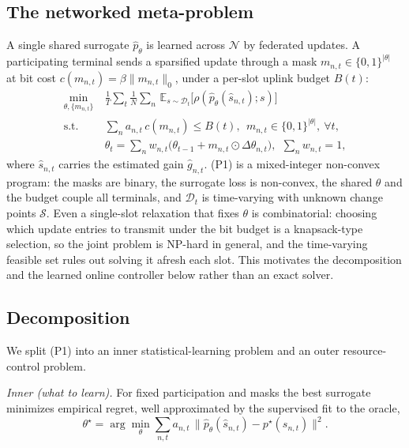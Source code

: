 \documentclass[journal]{IEEEtran}
\newcommand{\pstar}{p^{\star}}
\begin{document}
\subsection{The networked meta-problem}
A single shared surrogate $\hat p_\theta$ is learned across $\mathcal N$ by
federated updates. A participating terminal sends a sparsified update through a mask
$m_{n,t}\in\{0,1\}^{|\theta|}$ at bit cost $c(m_{n,t})=\beta\|m_{n,t}\|_0$, under a
per-slot uplink budget $B(t)$:
\begin{equation}
\tag{P1}
\begin{aligned}
\min_{\theta,\{m_{n,t}\}}\ &\frac1{T}{\textstyle\sum_{t}}\frac1{N}{\textstyle\sum_{n}}\,
   \mathbb E_{s\sim\mathcal D_t}\big[\rho(\hat p_\theta(\hat s_{n,t});s)\big]\\[-1pt]
\text{s.t.}\ & {\textstyle\sum_{n}} a_{n,t}\,c(m_{n,t})\le B(t),\ \ m_{n,t}\!\in\!\{0,1\}^{|\theta|},\ \forall t,\\[-1pt]
& \theta_{t}={\textstyle\sum_n} w_{n,t}\big(\theta_{t-1}+m_{n,t}\!\odot\!\Delta\theta_{n,t}\big),\ \ {\textstyle\sum_n} w_{n,t}=1,
\end{aligned}
\label{eq:p1}
\end{equation}
where $\hat s_{n,t}$ carries the estimated gain $\hat g_{n,t}$. (P1) is a
mixed-integer non-convex program: the masks are binary, the surrogate loss is
non-convex, the shared $\theta$ and the budget couple all terminals, and
$\mathcal D_t$ is time-varying with unknown change points $\mathcal S$. Even a
single-slot relaxation that fixes $\theta$ is combinatorial: choosing which update
entries to transmit under the bit budget is a knapsack-type selection, so the joint
problem is NP-hard in general, and the time-varying feasible set rules out solving
it afresh each slot. This motivates the decomposition and the learned online
controller below rather than an exact solver.

\subsection{Decomposition}\label{sec:decomp}
We split (P1) into an inner statistical-learning problem and an outer
resource-control problem.

\emph{Inner (what to learn).} For fixed participation and masks the best surrogate
minimizes empirical regret, well approximated by the supervised fit to the oracle,
\begin{equation}
\theta^{\star}=\arg\min_\theta \sum_{n,t} a_{n,t}\,\big\|\hat p_\theta(\hat s_{n,t})-\pstar(s_{n,t})\big\|^2 .
\label{eq:inner}
\end{equation}
\end{document}
